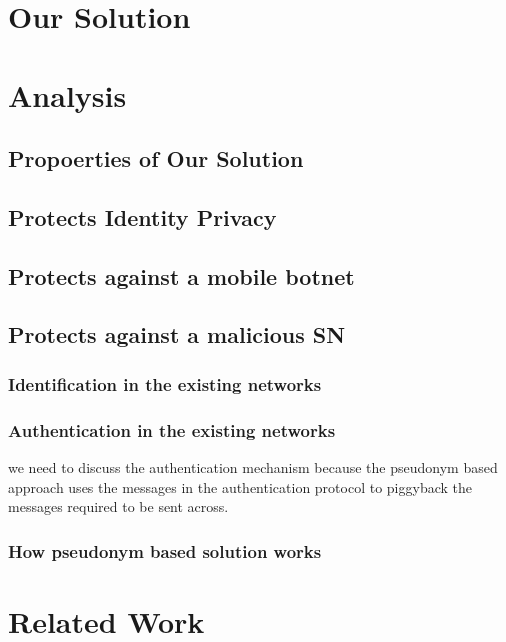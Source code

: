 \documentclass{llncs} %
\begin{document}
\section{Our Solution}

\section{Analysis}
\subsection{Propoerties of Our Solution}
\subsection{Protects Identity Privacy}
\subsection{Protects against a mobile botnet}
\subsection{Protects against a malicious SN}

\subsubsection{Identification in the existing networks}
\subsubsection{Authentication in the existing networks} we need to discuss the authentication mechanism because the pseudonym based approach uses the messages in the authentication protocol to piggyback the messages required to be sent across.
\subsubsection{How pseudonym based solution works}

\section{Related Work}
\end{document}
